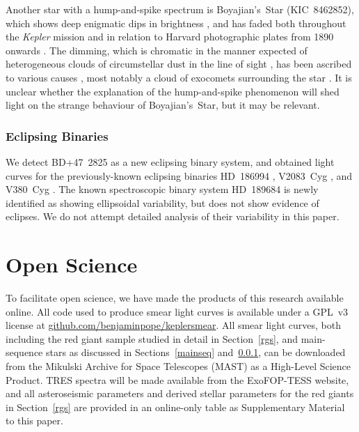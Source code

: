 \documentclass[a4paper,fleqn,usenatbib]{mnras}
\newcommand{\kepler}{\textit{Kepler}\xspace}
\begin{document}
Another star with a hump-and-spike spectrum is Boyajian's~Star (KIC~8462852), which shows deep enigmatic dips in brightness \citep{2016MNRAS.457.3988B}, and has faded both throughout the \kepler mission \citep{2016ApJ...830L..39M} and in relation to Harvard photographic plates from 1890 onwards \citep{2016ApJ...822L..34S}. The dimming, which is chromatic in the manner expected of heterogeneous clouds of circumstellar dust in the line of sight \citep{2018ApJ...853..130D,2018arXiv180608842B}, has been ascribed to various causes \citep[reviewed in][]{2018RNAAS...2a..16W}, most notably a cloud of exocomets surrounding the star \citep[e.g.][]{2018MNRAS.473.5286W}. It is unclear whether the explanation of the hump-and-spike phenomenon will shed light on the strange behaviour of Boyajian's~Star, but it may be relevant.

\subsubsection{Eclipsing Binaries}
\label{ebs}

We detect BD+47~2825 as a new eclipsing binary system, and obtained light curves for the previously-known eclipsing binaries HD~186994 \citep{2016AJ....151..101A}, V2083~Cyg \citep{2012MNRAS.421.1196Z}, and V380~Cyg \citep{2003A&A...399.1115C}. The known spectroscopic binary system HD~189684 \citep{2008MNRAS.389..869E} is newly identified as showing ellipsoidal variability, but does not show evidence of eclipses. We do not attempt detailed analysis of their variability in this paper.

\section{Open Science}
\label{open}

To facilitate open science, we have made the products of this research available online. All code used to produce smear light curves is available under a GPL~v3 license at \url{github.com/benjaminpope/keplersmear}. All smear light curves, both including the red giant sample studied in detail in Section~\ref{rgs}, and main-sequence stars as discussed in Sections~\ref{mainseq} and~\ref{ebs}, can be downloaded from the Mikulski Archive for Space Telescopes (MAST) as a High-Level Science Product. TRES spectra will be made available from the ExoFOP-TESS website, and all asteroseismic parameters and derived stellar parameters for the red giants in Section~\ref{rgs} are provided in an online-only table as Supplementary Material to this paper.
\end{document}
